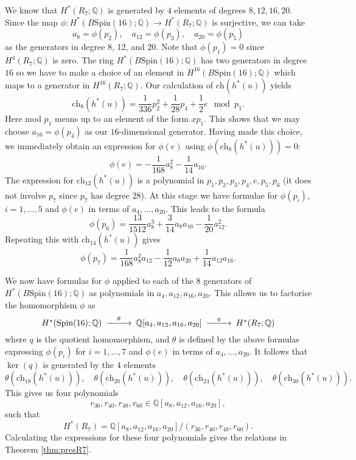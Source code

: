 \documentclass[twoside,a4paper,reqno,11pt]{amsart}
\newcommand{\Q}{\mathbb{Q}}
\newcommand{\Spin}{\mathrm{Spin}}
\newcommand{\ch}{\mathrm{ch}}
\begin{document}
We know that $H^*(R_7; \Q)$ is generated by $4$ elements of degrees $8, 12, 16, 20$.  Since the map $\phi : H^*(B\Spin(16); \Q) \to H^*(R_7; \Q)$ is surjective, we can take
$$
a_8 = \phi(p_2), \quad a_{12} =\phi(p_3), \quad a_{20} = \phi(p_5)
$$
as the generators in degree 8, 12, and 20. Note that $\phi(p_1) = 0$ since $H^4(R_7; \Q)$ is zero. The ring $H^*(B\Spin(16); \Q)$ has two generators in degree $16$ so we have to make a choice of an element in $H^{16}(B\Spin(16); \Q)$ which maps to a generator in $H^{16}(R_7; \Q)$. Our calculation of $\ch(h^*(u))$ yields   
$$
\ch_8(h^*(u)) = \frac{1}{336}p_2^2 + \frac{1}{28}p_4 + \frac{1}{2} e \mod p_1.
$$
Here mod $p_1$ means up to an element of the form $xp_1$. This shows that we may choose $a_{16} = \phi(p_4)$ as our $16$-dimensional generator. Having made this choice, we immediately obtain an expression for $\phi(e)$ using $\phi(\ch_8(h^*(u))) = 0$:  
$$
\phi(e) =  -\frac{1}{168}a_8^2 - \frac{1}{14}a_{16}.
$$
The expression for $\ch_{12}(h^*(u))$ is a polynomial in $p_1, p_2, p_3, p_4, e, p_5, p_6$ (it does not involve $p_7$ since $p_7$ has degree $28$). At this stage we have formulae for $\phi(p_i)$, $i=1, \ldots, 5$ and $\phi(e)$ in terms of $a_4, \ldots, a_{20}$. This leads to the formula    
$$
\phi(p_6) = \frac{13}{1512} a_8^3 + \frac{3}{14} a_8a_{16} - \frac{1}{20} a_{12}^2. 
$$
Repeating this with $\ch_{14}(h^*(u))$ gives
$$ 
\phi(p_7) = 
\frac{1}{168} a_8^2 a_{12} - \frac{1}{12} a_8 a_{20} + \frac{1}{14} a_{12} a_{16}.
$$

We now have formulas for $\phi$ applied to each of the $8$ generators of $H^*(B\Spin(16); \Q)$ as polynomials in $a_4, a_{12}, a_{16}, a_{20}$. This allows us to factorise the homomorphism $\phi$ as 
$$
\begin{CD}
H^*(\Spin(16); \Q) @>{\theta}>> \Q[a_4, a_{12}, a_{16}, a_{20}] @>{q}>> H^*(R_7; \Q)
\end{CD}
$$
where $q$ is the quotient homomorphism, and $\theta$ is defined by the above formulas expressing $\phi(p_i)$ for $i = 1, \dots, 7$ and $\phi(e)$ in terms of $a_4, \ldots, a_{20}$. It follows that $\ker(q)$ is generated by the $4$ elements
$$
\theta(\ch_{18}(h^*(u))), \quad \theta(\ch_{20}(h^*(u))), \quad \theta(\ch_{24}(h^*(u))), \quad \theta(\ch_{30}(h^*(u))).
$$
This gives us four polynomials
\[ r_{36}, r_{40}, r_{48}, r_{60} \in \Q[a_8, a_{12}, a_{16}, a_{20}], \]
such that
\[ H^*(R_7) = \Q[a_8, a_{12}, a_{16}, a_{20}]/(r_{36}, r_{40}, r_{48}, r_{60}).\]
Calculating the expressions for these four polynomials gives the relations in Theorem \ref{thm:presR7}.
\end{document}
